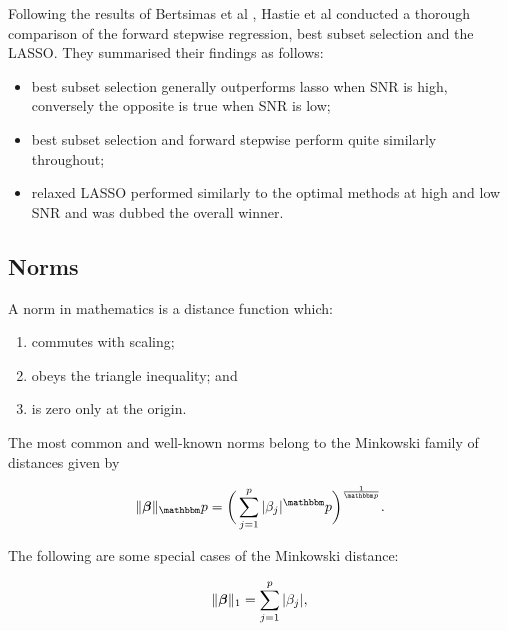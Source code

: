 Following the results of Bertsimas et al , Hastie et al  conducted a thorough comparison of the forward stepwise regression, best subset selection and the LASSO. They summarised their findings as follows:

\begin{itemize}
    \item best subset selection generally outperforms lasso when SNR is high, conversely the opposite is true when SNR is low; 
    \item best subset selection and forward stepwise perform quite similarly throughout;
    \item relaxed LASSO performed similarly to the optimal methods at high and low SNR and was dubbed the overall winner.
\end{itemize}

\subsection{Norms}

\begin{definition}[Norm]\label{def:norm}
A norm in mathematics is a distance function which:
\begin{spacing}{0}
\begin{enumerate}
    \item commutes with scaling;
    \item obeys the triangle inequality; and
    \item is zero only at the origin.
\end{enumerate}
\end{spacing}
\end{definition}

The most common and well-known norms belong to the Minkowski family of distances given by

\begin{equation}
    \Vert\Beta\Vert_\p = \bigg(\sum_{j=1}^p|\beta_j|^\p\bigg)^{\frac{1}{\p}}.
\end{equation}

The following are some special cases of the Minkowski distance:

\begin{definition}\label{def:manhattan-distance}
\begin{equation}\label{eqn:manhattan-distance}
    \Vert\boldsymbol{\beta}\Vert_1 = \sum_{j=1}^p|\beta_j|,
\end{equation}
\end{definition}

